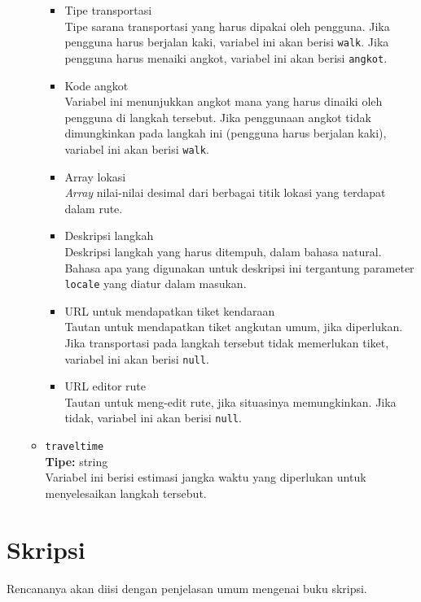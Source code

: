 \begin{itemize}
\begin{itemize}
		\begin{itemize}
			\item Tipe transportasi\\
			Tipe sarana transportasi yang harus dipakai oleh pengguna. Jika pengguna harus berjalan kaki, variabel ini akan berisi \verb|walk|. Jika pengguna harus menaiki angkot, variabel ini akan berisi \verb|angkot|.
			\item Kode angkot\\
			Variabel ini menunjukkan angkot mana yang harus dinaiki oleh pengguna di langkah tersebut. Jika penggunaan angkot tidak dimungkinkan pada langkah ini (pengguna harus berjalan kaki), variabel ini akan berisi \verb|walk|.
			\item Array \latlon lokasi\\
			\textit{Array} nilai-nilai desimal \latlon dari berbagai titik lokasi yang terdapat dalam rute.
			\item Deskripsi langkah\\
			Deskripsi langkah yang harus ditempuh, dalam bahasa natural. Bahasa apa yang digunakan untuk deskripsi ini tergantung parameter \verb|locale| yang diatur dalam masukan.
			\item URL untuk mendapatkan tiket kendaraan\\
			Tautan untuk mendapatkan tiket angkutan umum, jika diperlukan. Jika transportasi pada langkah tersebut tidak memerlukan tiket, variabel ini akan berisi \verb|null|.
			\item URL editor rute\\
			Tautan untuk meng-edit rute, jika situasinya memungkinkan. Jika tidak, variabel ini akan berisi \verb|null|.
		\end{itemize}
		
		\item \verb|traveltime|\\
		\textbf{Tipe:} string\\
		Variabel ini berisi estimasi jangka waktu yang diperlukan untuk menyelesaikan langkah tersebut.
	\end{itemize}
	
\end{itemize}

\section{Skripsi}
\label{sec:skripsi} 
 
Rencananya akan diisi dengan penjelasan umum mengenai buku skripsi.

